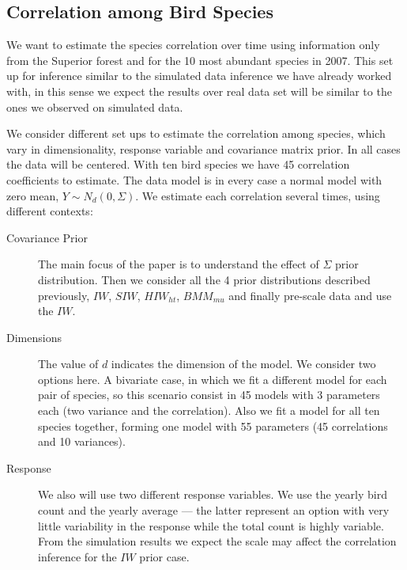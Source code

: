 \documentclass[a4paper]{article}
\begin{document}
\subsection{ Correlation among Bird Species}

We want to estimate the species correlation over time using information only from the Superior forest and for the 10 most abundant species in 2007. This set up for inference similar to the simulated data inference we have already worked with, in this sense we expect the results over real data set will be similar to the ones we observed on simulated data. 

We consider different set ups to estimate the correlation among species, which vary in dimensionality, response variable and covariance matrix prior. In all cases the data will be centered. With ten bird species we have 45 correlation coefficients to estimate. The data model is in every case a normal model with zero mean, $Y \sim N_d(0, \Sigma)$. We estimate each correlation several times, using different contexts:

\begin{description}
\item[Covariance Prior] The main focus of the paper is to understand the effect of  $\Sigma$ prior distribution. Then we consider all the 4 prior distributions described previously, $IW$, $SIW$, $HIW_{ht}$, $BMM_{mu}$ and finally pre-scale data and use the $IW$. 

\item[ Dimensions] The value of $d$ indicates the dimension of the model. We consider two options here. A bivariate case, in which we fit a different model for each pair of species, so this scenario consist in 45 models with 3 parameters each (two variance and the correlation). Also we fit a model for all ten species together, forming one model with 55 parameters (45 correlations and 10 variances). 

\item[Response] We also will use two different response variables. We use the yearly bird count and the yearly average --- the latter represent an option with very little variability in the response while the total count is highly variable. From the simulation results we expect the scale may affect the correlation inference for the $IW$ prior case. 
\end{description}
\end{document}
